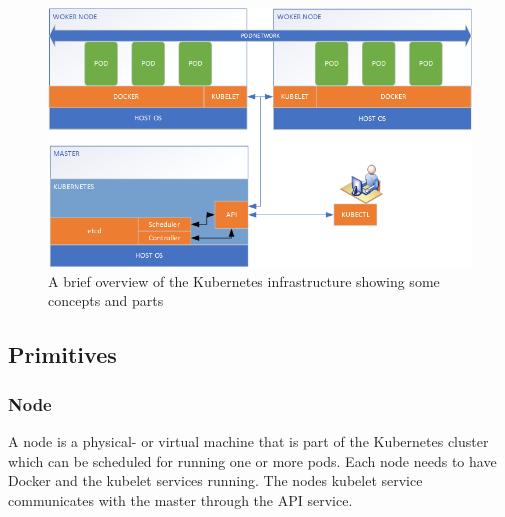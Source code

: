 \documentclass[../main.tex]{subfiles}
\begin{document}
\begin{figure}[H]
    \centering
    \includegraphics[scale=.75]{img/Kubernetes_overview.png}
    \caption{A brief overview of the Kubernetes infrastructure showing some concepts and parts}
    \label{fig:kubernetes_overview}
\end{figure}

\subsection{Primitives}
\subsubsection*{Node}
A node is a physical- or virtual machine that is part of the Kubernetes cluster which can be scheduled for running one or more pods. Each node needs to have Docker and the kubelet services running. The nodes kubelet service communicates with the master through the API service. \cite{kubernetes_nodes}
\end{document}
